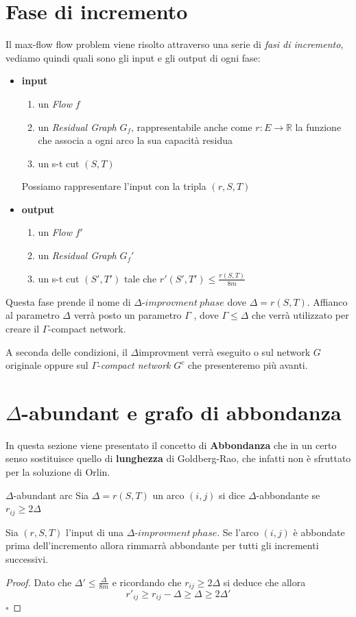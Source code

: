 \documentclass[a4paper, 11pt]{report}
\newcommand*{\QED}{\null\nobreak\hfill\ensuremath{\square}}%
\newcommand{\dlt}{$\Delta$}
\newcommand{\gmm}{$\Gamma$}
\begin{document}
\section{Fase di incremento}
Il max-flow flow problem viene risolto attraverso una serie di \textit{fasi di incremento}, vediamo quindi quali sono gli input e gli output di ogni fase:
\begin{itemize}[itemsep=0.5ex]
    \item \textbf{input}
    \begin{enumerate}
        \item un \textit{Flow} $f$
        \item un \textit{Residual Graph} $G_f$, rappresentabile anche come $r: E \rightarrow \mathbb{R}$ la funzione che associa a ogni arco la sua capacità residua
        \item un s-t cut $(S,T)$
    \end{enumerate}
    Possiamo rappresentare l'input con la tripla $(r,S,T)$
    \item \textbf{output}
    \begin{enumerate}
        \item un \textit{Flow} $f'$
        \item un \textit{Residual Graph} $G_f'$
        \item un s-t cut $(S',T')$ tale che $r'(S',T') \le \frac{r(S,T)}{8m}$
    \end{enumerate}
\end{itemize}
Questa fase prende il nome di $\Delta\text{-}improvment\ phase$ dove $\Delta = r(S,T)$.
Affianco al parametro $\Delta$ verrà posto un parametro $\Gamma$ , dove $\Gamma \le \Delta$ che verrà utilizzato per creare il $\Gamma$-compact network. 

A seconda delle condizioni, il \dlt improvment verrà eseguito o sul network $G$ originale oppure sul \gmm-\textit{compact network} $G^c$ che presenteremo più avanti.

\section{$\Delta$-abundant e grafo di abbondanza}
In questa sezione viene presentato il concetto di \textbf{Abbondanza} che in un certo senso sostituisce quello di \textbf{lunghezza} di Goldberg-Rao, che infatti non è sfruttato per la soluzione di Orlin.
\begin{definition}{$\Delta$-abundant arc}{}
    Sia $\Delta = r(S,T)$ un arco $(i,j)$ si dice $\Delta$-abbondante se $r_{ij} \ge 2\Delta$ 
     
\end{definition}
\begin{lemma}{}{}
    \label{ab4ever}
    Sia $(r,S,T)$ l'input di una $\Delta\text{-}improvment\ phase$. Se l'arco $(i,j)$ è abbondate prima dell'incremento allora rimmarrà abbondante per tutti gli incrementi successivi.
\end{lemma}
\begin{proof}
    Dato che 
    $\Delta' \le \frac{\Delta}{8m} $ e ricordando che $r_{ij} \ge 2\Delta $ si deduce che 
    allora \[r'_{ij} \ge r_{ij}-\Delta \ge\Delta\ge  2\Delta'\]\QED
\end{proof}
\end{document}
